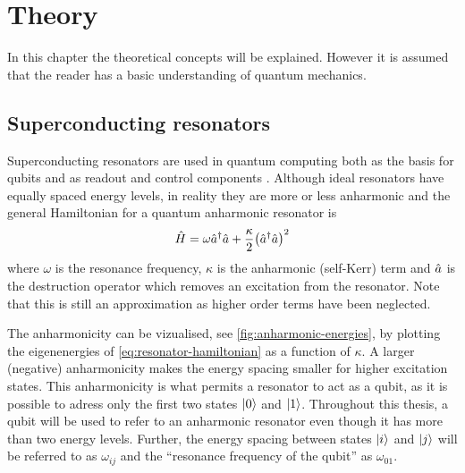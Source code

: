 \documentclass[main.tex]{subfiles}
\begin{document}
\chapter{Theory}
In this chapter the theoretical concepts will be explained.
However it is assumed that the reader has a basic understanding of quantum mechanics.

\section{Superconducting resonators}
Superconducting resonators are used in quantum computing both as the basis for qubits and as readout and control components \cite{}.
Although ideal resonators have equally spaced energy levels, in reality they are more or less anharmonic and the general Hamiltonian for a quantum anharmonic resonator is
\begin{equation}
    \hat{H} = \omega \hat{a}^\dagger\hat{a} + \frac{\kappa}{2} \qty(\hat{a}^\dagger\hat{a})^2
    \label{eq:resonator-hamiltonian}
\end{equation}
where \( \omega \) is the resonance frequency, \( \kappa \) is the anharmonic (self-Kerr) term and \(\hat{a}\) is the destruction operator which removes an excitation from the resonator.
Note that this is still an approximation as higher order terms have been neglected.

The anharmonicity can be vizualised, see \cref{fig:anharmonic-energies}, by plotting the eigenenergies of \cref{eq:resonator-hamiltonian} as a function of \( \kappa \).
A larger (negative) anharmonicity makes the energy spacing smaller for higher excitation states.
This anharmonicity is what permits a resonator to act as a qubit, as it is possible to adress only the first two states \( \ket{0} \) and \( \ket{1} \).
Throughout this thesis, a qubit will be used to refer to an anharmonic resonator even though it has more than two energy levels.
Further, the energy spacing between states \( \ket{i} \) and \( \ket{j} \) will be referred to as \( \omega_{ij} \) and the ``resonance frequency of the qubit'' as \( \omega_{01} \).

\end{document}
